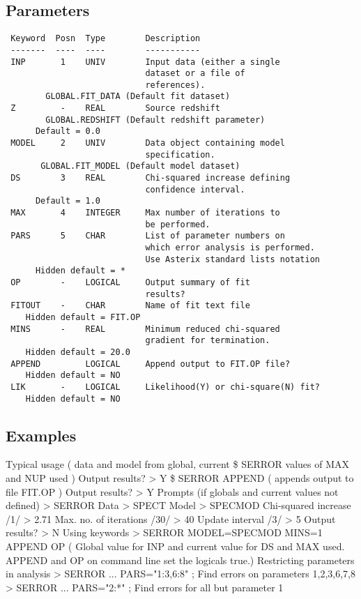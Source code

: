 \documentclass{book}
\renewcommand{\_}{{\tt\char'137}}     %
\begin{document}
\subsection{Parameters}
\begin{verbatim}
 Keyword  Posn  Type        Description
 -------  ----  ----        -----------
 INP       1    UNIV        Input data (either a single
                            dataset or a file of
                            references).
        GLOBAL.FIT_DATA (Default fit dataset)
 Z         -    REAL        Source redshift
        GLOBAL.REDSHIFT (Default redshift parameter)
      Default = 0.0
 MODEL     2    UNIV        Data object containing model
                            specification.
       GLOBAL.FIT_MODEL (Default model dataset)
 DS        3    REAL        Chi-squared increase defining
                            confidence interval.
      Default = 1.0
 MAX       4    INTEGER     Max number of iterations to
                            be performed.
 PARS      5    CHAR        List of parameter numbers on
                            which error analysis is performed.
                            Use Asterix standard lists notation
      Hidden default = *
 OP        -    LOGICAL     Output summary of fit
                            results?
 FITOUT    -    CHAR        Name of fit text file
    Hidden default = FIT.OP
 MINS      -    REAL        Minimum reduced chi-squared
                            gradient for termination.
    Hidden default = 20.0
 APPEND         LOGICAL     Append output to FIT.OP file?
    Hidden default = NO
 LIK       -    LOGICAL     Likelihood(Y) or chi-square(N) fit?
    Hidden default = NO

\end{verbatim}\subsection{Examples}
Typical usage
( data and model from global, current
\$ SERROR values of MAX and NUP used )
Output results? > Y
\$ SERROR APPEND ( appends output to file FIT.OP )
Output results? > Y
Prompts (if globals and current values not defined)
> SERROR
Data > SPECT
Model > SPECMOD
Chi-squared increase /1/ > 2.71
Max. no. of iterations /30/ > 40
Update interval /3/ > 5
Output results? > N
Using keywords
> SERROR MODEL=SPECMOD MINS=1 APPEND OP
( Global value for INP and current value for DS and
MAX used. APPEND and OP on command line set the
logicals true.)
Restricting parameters in analysis
> SERROR ... PARS="1:3,6:8" ; Find errors on parameters
1,2,3,6,7,8
> SERROR ... PARS="2:*" ; Find errors for all but
parameter 1
\end{document}
